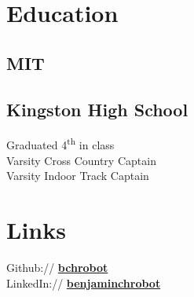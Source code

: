 \documentclass[letterpaper]{deedy-resume} %
\begin{document}
\begin{minipage}[t]{0.33\textwidth} %


\section{Education} 

\subsection{MIT}


\sectionspace %


\subsection{Kingston High School}

Graduated 4\textsuperscript{th} in class \\
Varsity Cross Country Captain \\
Varsity Indoor Track Captain \\

\sectionspace %


\section{Links} 

Github:// \href{https://github.com/bchrobot}{\bf bchrobot} \\
LinkedIn:// \href{https://www.linkedin.com/in/benjaminchrobot/}{\bf benjaminchrobot} \\


\end{minipage}
\end{document}
